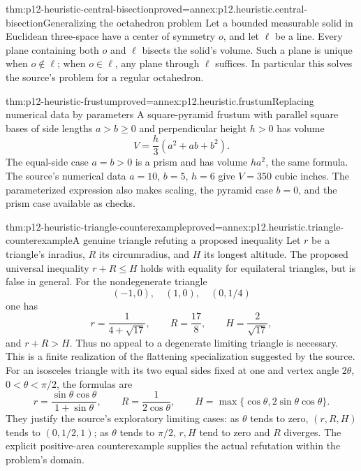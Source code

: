 \begin{hbtheorem}{thm:p12-heuristic-central-bisection}{proved=annex:p12.heuristic.central-bisection}{Generalizing the octahedron problem}
Let a bounded measurable solid in Euclidean three-space have a center
of symmetry \(o\), and let \(\ell\) be a line. Every plane
containing both \(o\) and \(\ell\) bisects the solid's volume.
Such a plane is unique when \(o\notin\ell\); when
\(o\in\ell\), any plane through \(\ell\) suffices.
In particular this solves the source's problem for a regular octahedron.
\end{hbtheorem}

\begin{hbtheorem}{thm:p12-heuristic-frustum}{proved=annex:p12.heuristic.frustum}{Replacing numerical data by parameters}
A square-pyramid frustum with parallel square bases of side lengths
\(a>b\ge0\) and perpendicular height \(h>0\) has volume
\[
                    V=\frac h3(a^2+ab+b^2).
\]
The equal-side case \(a=b>0\) is a prism and has volume \(ha^2\),
the same formula. The source's numerical data \(a=10\), \(b=5\),
\(h=6\) give \(V=350\) cubic inches. The parameterized expression
also makes scaling, the pyramid case \(b=0\), and the prism case
available as checks.
\end{hbtheorem}

\begin{hbtheorem}{thm:p12-heuristic-triangle-counterexample}{proved=annex:p12.heuristic.triangle-counterexample}{A genuine triangle refuting a proposed inequality}
Let \(r\) be a triangle's inradius, \(R\) its circumradius,
and \(H\) its longest altitude. The proposed universal inequality
\(r+R\le H\) holds with equality for equilateral triangles,
but is false in general. For the nondegenerate triangle
\[
                   (-1,0),\quad(1,0),\quad(0,1/4)
\]
one has
\[
 r=\frac1{4+\sqrt{17}},\qquad R=\frac{17}{8},\qquad
 H=\frac2{\sqrt{17}},
\]
and \(r+R>H\). Thus no appeal to a degenerate limiting triangle
is necessary. This is a finite realization of the flattening
specialization suggested by the source.
For an isosceles triangle with its two equal sides fixed at one and
vertex angle \(2\theta\), \(0<\theta<\pi/2\), the formulas are
\[
 r=\frac{\sin\theta\cos\theta}{1+\sin\theta},\qquad
 R=\frac1{2\cos\theta},\qquad
 H=\max\{\cos\theta,2\sin\theta\cos\theta\}.
\]
They justify the source's exploratory limiting cases: as \(\theta\)
tends to zero, \((r,R,H)\) tends to \((0,1/2,1)\); as
\(\theta\) tends to \(\pi/2\), \(r,H\) tend to zero and
\(R\) diverges. The explicit positive-area counterexample supplies
the actual refutation within the problem's domain.
\end{hbtheorem}


